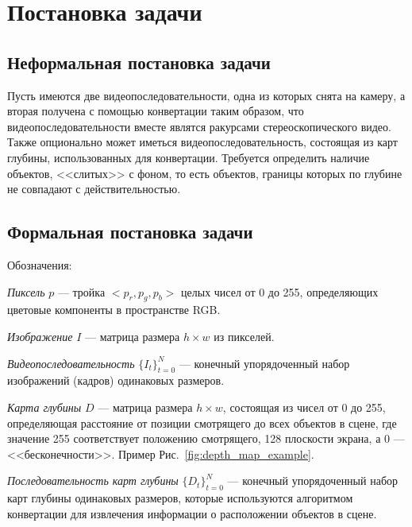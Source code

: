 \documentclass[14pt, a4paper]{extarticle}
\begin{document}
\newpage
\section{Постановка задачи}

\subsection{Неформальная постановка задачи}

Пусть имеются две видеопоследовательности, одна из которых снята на камеру, 
а вторая получена с помощью конвертации таким образом, 
что видеопоследовательности вместе являтся ракурсами стереоскопического видео. 
Также опционально может иметься видеопоследовательность, состоящая из карт глубины, 
использованных для конвертации. Требуется определить наличие объектов, <<слитых>> с фоном, 
то есть объектов, границы которых по глубине не совпадают с действительностью.

\subsection{Формальная постановка задачи}

Обозначения:

\textit{Пиксель} $p$ --- тройка $<p_r,p_g,p_b>$ целых чисел от 0 до 255, 
определяющих цветовые компоненты в пространстве RGB.

\textit{Изображение} $I$ --- матрица размера $h \times w$ из пикселей.

\textit{Видеопоследовательность} $\{I_t\}_{t=0}^N$ --- конечный упорядоченный набор 
изображений (кадров) одинаковых размеров.



\textit{Карта глубины} $D$ --- матрица размера $h \times w$, состоящая из чисел от 0 до 255,
определяющая расстояние от позиции смотрящего до всех объектов в сцене, 
где значение 255 соответствует положению смотрящего, 128 плоскости экрана, 
а 0 --- <<бесконечности>>. Пример Рис.~\ref{fig:depth_map_example}.

\textit{Последовательность карт глубины} $\{D_t\}_{t=0}^N$ --- конечный упорядоченный 
набор карт глубины одинаковых размеров, которые используются алгоритмом конвертации 
для извлечения информации о расположении объектов в сцене.
\end{document}
